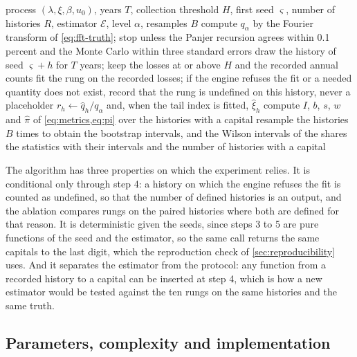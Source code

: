 \begin{algorithm}[htbp]
\caption{Measurement of the instability of a capital estimator against a known truth}
\label{alg:protocol}
\begin{algorithmic}[1]
\Require process $(\lambda,\xi,\beta,u_0)$, years $T$, collection threshold $H$, first seed $\varsigma$, number of histories $R$, estimator $\mathcal{E}$, level $\alpha$, resamples $B$
\State compute $q_\alpha$ by the Fourier transform of \cref{eq:fft-truth}; stop unless the Panjer recursion agrees within 0.1 percent and the Monte Carlo within three standard errors
\State draw the history of seed $\varsigma+h$ for $T$ years; keep the losses at or above $H$ and the recorded annual counts
\State fit the rung on the recorded losses; if the engine refuses the fit or a needed quantity does not exist, record that the rung is undefined on this history, never a placeholder
\State $r_h\leftarrow\hat q_h/q_\alpha$ and, when the tail index is fitted, $\hat\xi_h$
\EndFor
\State compute $I$, $b$, $s$, $w$ and $\hat\pi$ of \cref{eq:metrics,eq:pi} over the histories with a capital
\State resample the histories $B$ times to obtain the bootstrap intervals, and the Wilson intervals of the shares
\State \Return the statistics with their intervals and the number of histories with a capital
\end{algorithmic}
\end{algorithm}

The algorithm has three properties on which the experiment relies. It is conditional only through step 4: a history on which the engine refuses the fit is counted as undefined, so that the number of defined histories is an output, and the ablation compares rungs on the paired histories where both are defined for that reason. It is deterministic given the seeds, since steps 3 to 5 are pure functions of the seed and the estimator, so the same call returns the same capitals to the last digit, which the reproduction check of \cref{sec:reproducibility} uses.
And it separates the estimator from the protocol: any function from a recorded history to a capital can be inserted at step 4, which is how a new estimator would be tested against the ten rungs on the same histories and the same truth.

\subsection{Parameters, complexity and implementation}
\label{sec:pm-implementation}

